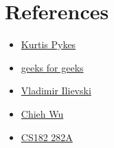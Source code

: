 \documentclass{article}
\begin{document}
\section{References}
\begin{itemize}
    \item \href{https://www.datacamp.com/tutorial/the-cross-entropy-loss-function-in-machine-learning}{Kurtis Pykes}
    \item \href{https://www.geeksforgeeks.org/cross-entropy-cost-functions-used-in-classification/}{geeks for geeks}
    \item \href{https://isquared.digital/blog/2023-03-15-illustrated-batch-vs-layer-norm/}{Vladimir Ilievski}
    \item \href{https://www.youtube.com/watch?v=ALm-nzS0if4}{Chieh Wu}
    \item \href{https://cs182sp22.github.io/assets/lecture_slides/2022.02.28-mt1-review.pdf}{CS182 282A}
    
\end{itemize}
\end{document}
